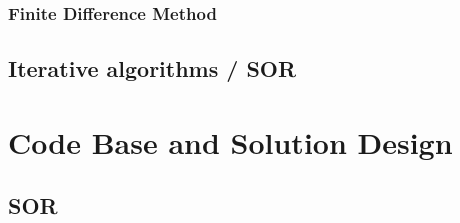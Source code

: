 \documentclass[paper=a4, fontsize=10pt]{scrartcl} %
\begin{document}
\subsubsection{Finite Difference Method}





\subsection {Iterative algorithms / SOR}
\clearpage
\section{Code Base and Solution Design}
\subsection{SOR}
\end{document}
